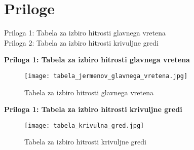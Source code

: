 \newpage

\section{Priloge}

Priloga 1: Tabela za izbiro hitrosti glavnega vretena \\
Priloga 2: Tabela za izbiro hitrosti krivuljne gredi

\newpage
\thispagestyle{empty}
\textbf{\fontsize{14}{21}\selectfont Priloga 1: Tabela za izbiro hitrosti glavnega vretena}
\label{tabela_za_izbiro_hitrosti}
\begin{figure}[H]
	\begin{center}
		\texttt{[image: tabela\_jermenov\_glavnega\_vretena.jpg]}
		\caption{Tabela za izbiro hitrosti glavnega vretena
			\cite{gauthier}}
	\end{center}
\end{figure}

\newpage
\thispagestyle{empty}
\textbf{\fontsize{14}{21}\selectfont Priloga 1: Tabela za izbiro hitrosti krivuljne gredi}
\label{tabela_krivuljna_gred}
\begin{figure}[H]
	\begin{center}
		\texttt{[image: tabela\_krivulna\_gred.jpg]}
		\caption{Tabela za izbiro hitrosti krivuljne gredi
			\cite{gauthier}}
	\end{center}
\end{figure}